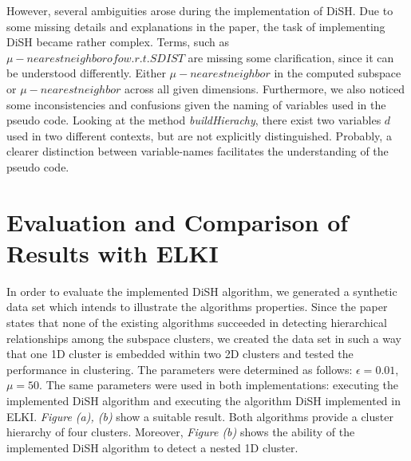 \documentclass{article}
\begin{document}
However, several ambiguities arose during the implementation of DiSH. Due to some missing details and explanations in the paper, the task of implementing DiSH became rather complex. Terms, such as $\mu - nearest neighbor of o w.r.t. SDIST$ are missing some clarification, since it can be understood differently. Either $\mu -nearest neighbor$ in the computed subspace or $\mu -nearest neighbor$ across all given dimensions. Furthermore, we also noticed some inconsistencies and confusions given the naming of variables used in the pseudo code. Looking at the method \emph{buildHierachy}, there exist two variables $d$ used in two different contexts, but are not explicitly distinguished. Probably, a clearer distinction between variable-names facilitates the understanding of the pseudo code.    

\section{Evaluation and Comparison of Results with ELKI}

In order to evaluate the implemented DiSH algorithm, we generated a synthetic data set which intends to illustrate the algorithms properties. Since the paper states that none of the existing algorithms succeeded in detecting hierarchical relationships among the subspace clusters, we created the data set in such a way that one 1D cluster is embedded within two 2D clusters and tested the performance in clustering. The parameters were determined as follows: $\epsilon = 0.01$, $\mu = 50$. The same parameters were used in both implementations: executing the implemented DiSH algorithm and executing the algorithm DiSH implemented in ELKI. \emph{Figure (a), (b)} show a suitable result. Both algorithms provide a cluster hierarchy of four clusters. Moreover, \emph{Figure (b)} shows the ability of the implemented DiSH algorithm to detect a nested 1D cluster. 
\end{document}

